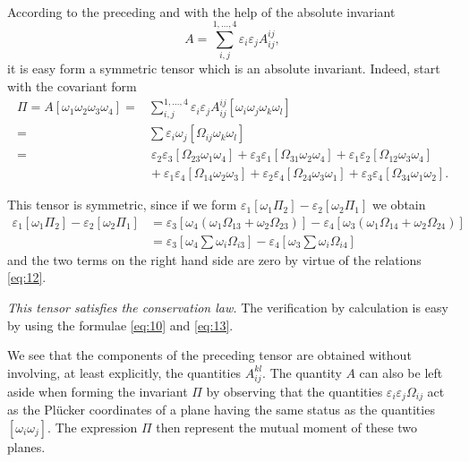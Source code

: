 \documentclass[leqno,12pt]{article}
\makeatletter
\let\old@epsilon\epsilon
\let\old@varepsilon\varepsilon
\let\epsilon\old@varepsilon
\let\varepsilon\old@epsilon
\theoremstyle{shape1}
\theoremstyle{shape0}
\theoremstyle{shape2}
\theoremstyle{definition}
\makeatother
\begin{document}
\paragraph{}
\label{sec:38}
According to the preceding and with the help of the absolute invariant
\[
A=\sum_{i,j}^{1,\dots,4}\epsilon_{i}\epsilon_{j}A^{ij}_{ij},
\]
it is easy form a symmetric tensor which is an absolute invariant. Indeed, start with the covariant form
\begin{align*}
  \Pi=A[\omega_{1}\omega_{2}\omega_{3}\omega_{4}]=&{}\sum_{i,j}^{1,\dots,4}\epsilon_{i}\epsilon_{j}A^{ij}_{ij}[\omega_{i}\omega_{j}\omega_{k}\omega_{l}]\\
  =&{}\sum\epsilon_{i}\omega_{j}[\Omega_{ij}\omega_{k}\omega_{l}]\\
  =&{}\ \epsilon_{2}\epsilon_{3}[\Omega_{23}\omega_{1}\omega_{4}]+\epsilon_{3}\epsilon_{1}[\Omega_{31}\omega_{2}\omega_{4}]+\epsilon_{1}\epsilon_{2}[\Omega_{12}\omega_{3}\omega_{4}]\\
  &{}+\epsilon_{1}\epsilon_{4}[\Omega_{14}\omega_{2}\omega_{3}]+\epsilon_{2}\epsilon_{4}[\Omega_{24}\omega_{3}\omega_{1}]+\epsilon_{3}\epsilon_{4}[\Omega_{34}\omega_{1}\omega_{2}].
\end{align*}

This tensor is symmetric, since if we form $\epsilon_{1}[\omega_{1}\Pi_{2}]-\epsilon_{2}[\omega_{2}\Pi_{1}]$ we obtain
\begin{align*}
  \epsilon_{1}[\omega_{1}\Pi_{2}]-\epsilon_{2}[\omega_{2}\Pi_{1}]&=\epsilon_{3}[\omega_{4}(\omega_{1}\Omega_{13}+\omega_{2}\Omega_{23})]-\epsilon_{4}[\omega_{3}(\omega_{1}\Omega_{14}+\omega_{2}\Omega_{24})]\\
  &=\epsilon_{3}[\omega_{4}\sum\omega_{i}\Omega_{i3}]-\epsilon_{4}[\omega_{3}\sum\omega_{i}\Omega_{i4}]
\end{align*}
and the two terms on the right hand side are zero by virtue of the relations \eqref{eq:12}.

\emph{This tensor satisfies the conservation law.} The verification by calculation is easy by using the formulae \eqref{eq:10} and \eqref{eq:13}.

We see that the components of the preceding tensor are obtained without involving, at least explicitly, the quantities $A_{ij}^{kl}$. The quantity $A$ can also be left aside when forming the invariant $\Pi$ by observing that the quantities $\epsilon_{i}\epsilon_{j}\Omega_{ij}$ act as the Plücker coordinates of a plane having the same status as the quantities $[\omega_{i}\omega_{j}]$. The expression $\Pi$ then represent the mutual moment of these two planes.
\end{document}
